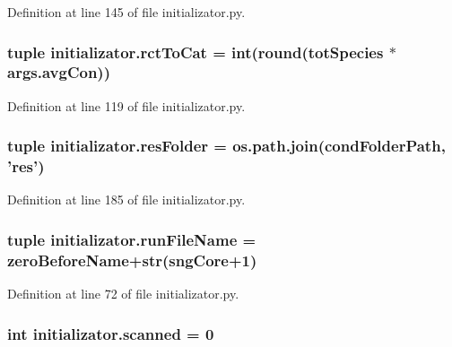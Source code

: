 Definition at line 145 of file initializator.\-py.

\hypertarget{a00135_afee9c574290c862d3ad8a51a77b2a72e}{
\subsubsection[{rct\-To\-Cat}]{\setlength{\rightskip}{0pt plus 5cm}tuple initializator.\-rct\-To\-Cat = int(round({\bf tot\-Species} $\ast$ args.\-avg\-Con))}}\label{a00135_afee9c574290c862d3ad8a51a77b2a72e}


Definition at line 119 of file initializator.\-py.

\hypertarget{a00135_ae3ceb468287bbef82c0134b3eeea4419}{
\subsubsection[{res\-Folder}]{\setlength{\rightskip}{0pt plus 5cm}tuple initializator.\-res\-Folder = os.\-path.\-join({\bf cond\-Folder\-Path}, 'res')}}\label{a00135_ae3ceb468287bbef82c0134b3eeea4419}


Definition at line 185 of file initializator.\-py.

\hypertarget{a00135_a47868487619848c8ead2458c6855426a}{
\subsubsection[{run\-File\-Name}]{\setlength{\rightskip}{0pt plus 5cm}tuple initializator.\-run\-File\-Name = {\bf zero\-Before\-Name}+str(sng\-Core+1)}}\label{a00135_a47868487619848c8ead2458c6855426a}


Definition at line 72 of file initializator.\-py.

\hypertarget{a00135_afafc4f533cad86cb7fd1b6fe5ed9effa}{
\subsubsection[{scanned}]{\setlength{\rightskip}{0pt plus 5cm}int initializator.\-scanned = 0}}\label{a00135_afafc4f533cad86cb7fd1b6fe5ed9effa}


